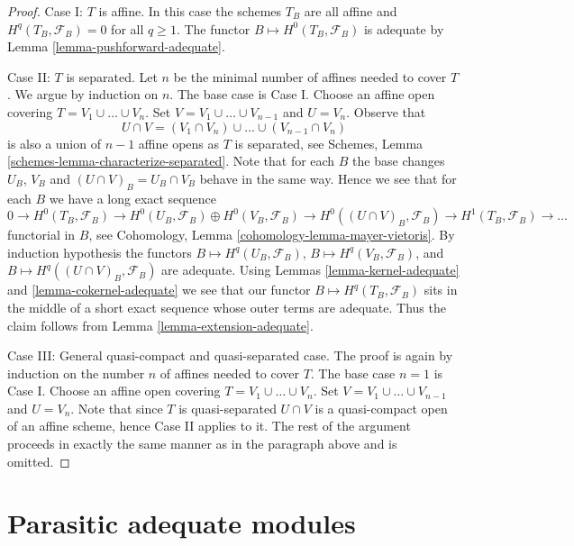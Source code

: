 \begin{proof}
\medskip\noindent
Case I: $T$ is affine. In this case the schemes $T_B$ are all affine
and $H^q(T_B, \mathcal{F}_B) = 0$ for all $q \geq 1$.
The functor $B \mapsto H^0(T_B, \mathcal{F}_B)$ is adequate by
Lemma \ref{lemma-pushforward-adequate}.

\medskip\noindent
Case II: $T$ is separated. Let $n$ be the minimal number of affines needed
to cover $T$. We argue by induction on $n$. The base case is Case I.
Choose an affine open covering $T = V_1 \cup \ldots \cup V_n$.
Set $V = V_1 \cup \ldots \cup V_{n - 1}$ and $U = V_n$. Observe that
$$
U \cap V = (V_1 \cap V_n) \cup \ldots \cup (V_{n - 1} \cap V_n)
$$
is also a union of $n - 1$ affine opens as $T$ is separated, see
Schemes, Lemma \ref{schemes-lemma-characterize-separated}.
Note that for each $B$ the base changes $U_B$, $V_B$ and
$(U \cap V)_B = U_B \cap V_B$ behave in the same way. Hence we see that
for each $B$ we have a long exact sequence
$$
0 \to
H^0(T_B, \mathcal{F}_B) \to
H^0(U_B, \mathcal{F}_B) \oplus H^0(V_B, \mathcal{F}_B) \to
H^0((U \cap V)_B, \mathcal{F}_B) \to
H^1(T_B, \mathcal{F}_B) \to \ldots
$$
functorial in $B$, see
Cohomology, Lemma \ref{cohomology-lemma-mayer-vietoris}.
By induction hypothesis the functors
$B \mapsto H^q(U_B, \mathcal{F}_B)$,
$B \mapsto H^q(V_B, \mathcal{F}_B)$, and
$B \mapsto H^q((U \cap V)_B, \mathcal{F}_B)$
are adequate. Using
Lemmas \ref{lemma-kernel-adequate} and
\ref{lemma-cokernel-adequate}
we see that our functor $B \mapsto H^q(T_B, \mathcal{F}_B)$ sits in the
middle of a short exact sequence whose outer terms are adequate.
Thus the claim follows from
Lemma \ref{lemma-extension-adequate}.

\medskip\noindent
Case III: General quasi-compact and quasi-separated case.
The proof is again by induction on the number $n$ of affines needed to
cover $T$. The base case $n = 1$ is Case I.
Choose an affine open covering $T = V_1 \cup \ldots \cup V_n$.
Set $V = V_1 \cup \ldots \cup V_{n - 1}$ and $U = V_n$. Note that
since $T$ is quasi-separated $U \cap V$ is a quasi-compact open of an
affine scheme, hence Case II applies to it. The rest of the argument
proceeds in exactly the same manner as in the paragraph above and is
omitted.
\end{proof}







\section{Parasitic adequate modules}
\label{section-parasitic}

